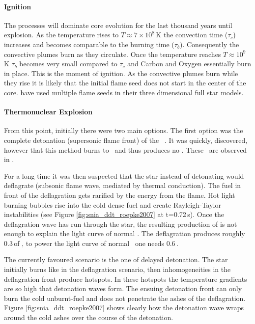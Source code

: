 \paragraph{Ignition}
The \urca processes will dominate core evolution for the last thousand years until explosion. As the temperature rises to $T\approx7 \times 10^8$\,K \citep{2000ARA&A..38..191H} the convection time ($\tau_c$) increases and becomes comparable to the burning time ($\tau_b$). Consequently the convective plumes burn as they circulate. Once the temperature reaches $T\approx 10^9$\,K $\tau_b$ becomes very small compared to $\tau_c$ and Carbon and Oxygen essentially burn in place. 
This is the moment of ignition. As the convective plumes burn while they rise it is likely that the initial flame seed does not start in the center of the core. \cite{2005A&A...431..635R} have used multiple flame seeds in their three dimensional full star models.

\paragraph{Thermonuclear Explosion}
From this point, initially there were two main options. The first option was the complete detonation (supersonic flame front) of the \cowd\ \citep{1969Ap&SS...5..180A}. It was quickly, discovered, however that this method burns to \nse\ and thus produces no \ime. These \ime\ are observed in \snia.

For a long time it was then suspected that the star instead of detonating would deflagrate (subsonic flame wave, mediated by thermal conduction). The fuel in front of the deflagration gets rarified by the energy from the flame. Hot light burning bubbles rise into the cold dense fuel and create Rayleigh-Taylor instabilities (see Figure \ref{fig:snia_ddt_roepke2007} at t=0.72\,s). 
Once the deflagration wave has run through the star, the resulting production of \Ni[56] is not enough to explain the light curve of normal \snia. The deflagration produces roughly 0.3\,\msun of \Ni[56], to power the light curve of normal \sneia\ one needs 0.6\,\msun \citep{2007Sci...315..825M}.

The currently favoured scenario is the one of delayed detonation. The star initially burns like in the deflagration scenario, then inhomogeneities in the deflagration front produce hotspots. In these hotspots the temperature gradients are so high that detonation waves form. The ensuing detonation front can only burn the cold unburnt-fuel and does not penetrate the ashes of the deflagration. Figure \ref{fig:snia_ddt_roepke2007} shows clearly how the detonation wave wraps around the cold ashes over the course of the detonation.


